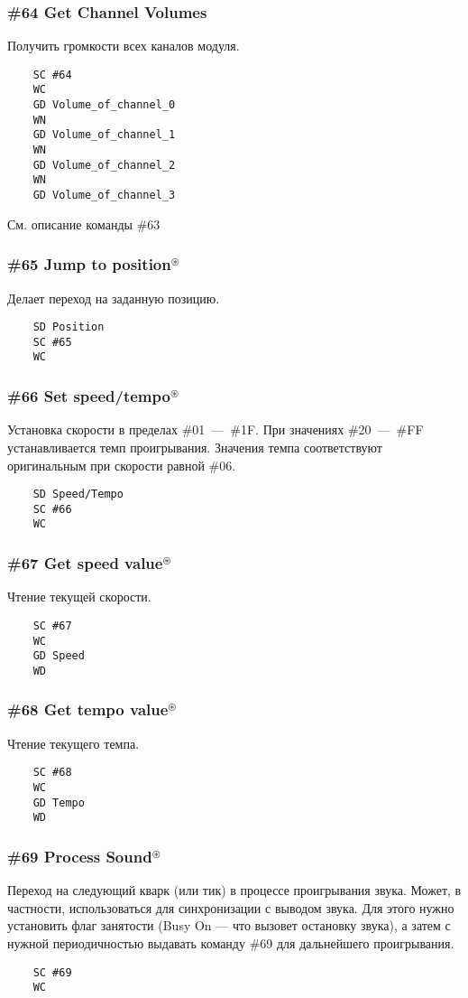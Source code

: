 \documentclass[a4paper,11pt]{article}
\DeclareRobustCommand{\Cyrax}{\texorpdfstring{\(^\circledast\)}{\circledast}}
\begin{document}
\subsubsection{\#64 Get Channel Volumes\label{cmd:64}}
Получить громкости всех каналов модуля.
\begin{verbatim}
    SC #64
    WC
    GD Volume_of_channel_0
    WN
    GD Volume_of_channel_1
    WN
    GD Volume_of_channel_2
    WN
    GD Volume_of_channel_3
\end{verbatim}

См. описание команды \#63
\subsubsection{\#65 Jump to position\Cyrax}
Делает переход на заданную позицию.
\begin{verbatim}
    SD Position
    SC #65
    WC
\end{verbatim}

\subsubsection{\#66 Set speed/tempo\Cyrax}
Установка скорости в пределах \#01~---~\#1F. При значениях \#20~---~\#FF устанавливается темп проигрывания. Значения темпа соответствуют оригинальным при скорости равной \#06.
\begin{verbatim}
    SD Speed/Tempo
    SC #66
    WC
\end{verbatim}

\subsubsection{\#67 Get speed value\Cyrax}
Чтение текущей скорости.
\begin{verbatim}
    SC #67
    WC
    GD Speed
    WD
\end{verbatim}

\subsubsection{\#68 Get tempo value\Cyrax}
Чтение текущего темпа.
\begin{verbatim}
    SC #68
    WC
    GD Tempo
    WD
\end{verbatim}

\subsubsection{\#69 Process Sound\Cyrax}
Переход на следующий кварк (или тик) в процессе проигрывания звука. Может, в частности, использоваться  для синхронизации с выводом звука. Для этого нужно установить флаг занятости (Busy On — что вызовет остановку звука), а затем с нужной периодичностью  выдавать команду \#69 для дальнейшего проигрывания.
\begin{verbatim}
    SC #69
    WC
\end{verbatim}
\end{document}
